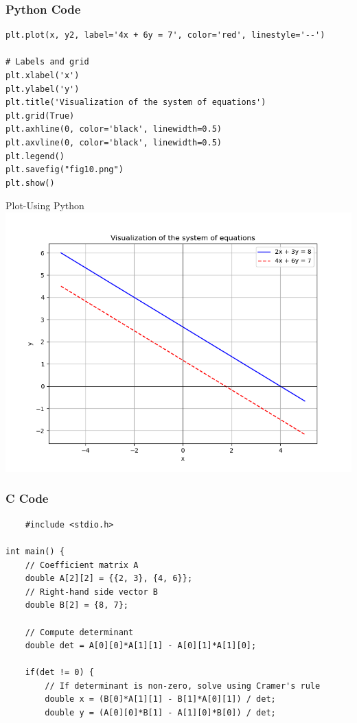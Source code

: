 \documentclass{beamer}
\begin{document}
\begin{frame}[fragile]
    \frametitle{Python Code}
    \begin{lstlisting}
plt.plot(x, y2, label='4x + 6y = 7', color='red', linestyle='--')

# Labels and grid
plt.xlabel('x')
plt.ylabel('y')
plt.title('Visualization of the system of equations')
plt.grid(True)
plt.axhline(0, color='black', linewidth=0.5)
plt.axvline(0, color='black', linewidth=0.5)
plt.legend()
plt.savefig("fig10.png")
plt.show()

\end{lstlisting}
\end{frame}


\begin{frame}{Plot-Using Python}
    \centering
    \includegraphics[width=\columnwidth, height=0.8\textheight, keepaspectratio]{figs/fig10.png}     
\end{frame}


\begin{frame}[fragile]
\frametitle{C Code}
\begin{lstlisting}
    #include <stdio.h>

int main() {
    // Coefficient matrix A
    double A[2][2] = {{2, 3}, {4, 6}};
    // Right-hand side vector B
    double B[2] = {8, 7};

    // Compute determinant
    double det = A[0][0]*A[1][1] - A[0][1]*A[1][0];

    if(det != 0) {
        // If determinant is non-zero, solve using Cramer's rule
        double x = (B[0]*A[1][1] - B[1]*A[0][1]) / det;
        double y = (A[0][0]*B[1] - A[1][0]*B[0]) / det;
        \end{lstlisting}

\end{frame}
\end{document}
